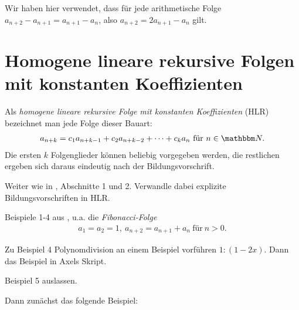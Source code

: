 \documentclass[11pt,a4paper]{article}
\begin{document}
Wir haben hier verwendet, dass für jede arithmetische Folge
$a_{n+2}-a_{n+1}=a_{n+1}-a_n$, also $a_{n+2}=2a_{n+1}-a_n$ gilt.

\section*{Homogene lineare rekursive Folgen mit konstanten Koeffizienten}

Als \emph{homogene lineare rekursive Folge mit konstanten Koeffizienten} (HLR) 
bezeichnet man jede Folge dieser Bauart:
\begin{gather*}
  a_{n+k}=c_1a_{n+k-1}+c_2a_{n+k-2}+\dots+c_ka_n\ \text{für}\ n\in\N.
\end{gather*}
Die ersten $k$ Folgenglieder können beliebig vorgegeben werden, die restlichen
ergeben sich daraus eindeutig nach der Bildungsvorschrift.

Weiter wie in \cite{S}, Abschnitte 1 und 2. Verwandle dabei explizite
Bildungsvorschriften in HLR.  

Beispiele 1-4 aus \cite{S}, u.a. die \emph{Fibonacci-Folge}
\begin{gather*}
  a_1=a_2=1,\ a_{n+2}=a_{n+1}+a_n\ \text{für}\ n>0.
\end{gather*}

Zu Beispiel 4 Polynomdivision an einem Beispiel vorführen $1:(1-2x)$. Dann das
Beispiel in Axels Skript.

Beispiel 5 auslassen.

Dann zunächst das folgende Beispiel:
\end{document}

